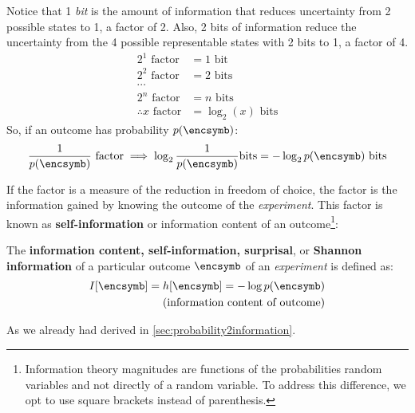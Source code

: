 Notice that 1 \emph{bit} is the amount of information that reduces uncertainty from 2 possible states to 1, a factor of 2. Also, 2 bits of information reduce the uncertainty from the 4 possible representable states with 2 bits to 1, a factor of 4.
\begin{align*}
	2^1 \text{ factor} &=  1\text{ bit} \\
	2^2 \text{ factor} &=  2\text{ bits} \\
	\cdots\\
	2^n \text{ factor} &= n\text{ bits}  \\
	\therefore x \text{ factor} &= \log_2 (x) \text{ bits}
\end{align*}
So, if an outcome has probability \(p(\encsymb)\):
\begin{align*}
	\frac{1}{p(\encsymb)} \text{ factor}  \implies \log_2 \frac{1}{p(\encsymb)} \text{bits} = - \log_2 p(\encsymb) \text{ bits}
\end{align*}

If the factor is a measure of the reduction in freedom of choice, the factor is the information gained by knowing the outcome of the \emph{experiment}. This factor is known as \textbf{self-information} or information content of an outcome\footnote{Information theory magnitudes are functions of the probabilities random variables and not directly of a random variable. To address this difference, we opt to use square brackets instead of parenthesis.}:
\begin{definition}\label{def:surprisal}
	The \textbf{information content, self-information, surprisal}, or \textbf{Shannon information} of a particular outcome \(\encsymb\) of an \emph{experiment} is defined as:
	\begin{align}
		I[\encsymb] = h[\encsymb]= -\log p(\encsymb)\\
		\tag{information content of outcome}
	\end{align}
\end{definition}
As we already had derived in \cref{sec:probability2information}.

